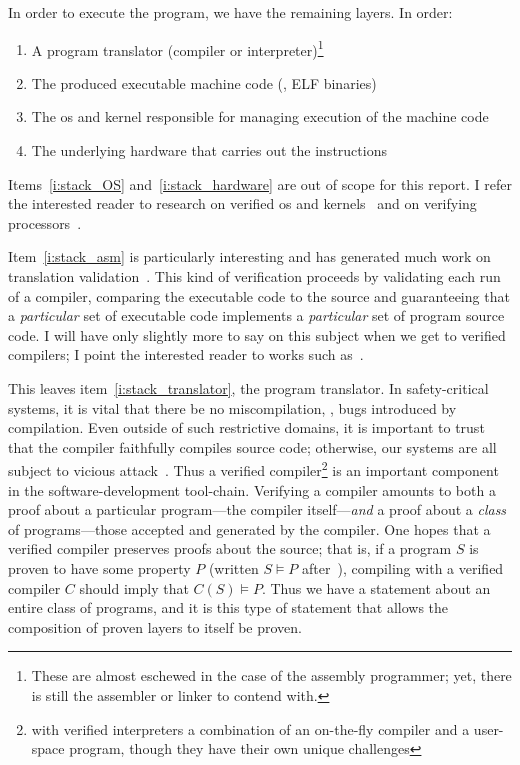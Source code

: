 In order to execute the program, we have the remaining layers. In order:
\begin{enumerate}
    \item\label{i:stack_translator} A program translator (compiler or
        interpreter)\footnote{These are almost eschewed in the case of the
        assembly programmer; yet, there is still the assembler or linker to
        contend with.}
    \item\label{i:stack_asm} The produced executable machine code (\eg, ELF
        binaries)
    \item\label{i:stack_OS} The \gls{os} and kernel responsible for managing execution
        of the machine code
    \item\label{i:stack_hardware} The underlying hardware that carries out the
        instructions
\end{enumerate}

Items~\ref{i:stack_OS} and~\ref{i:stack_hardware} are out of scope for this
report. I refer the interested reader to research on verified \gls{os} and
kernels~\cite{Klein_EHACDEEKNSTW_09,Klein_AEHCDEEKNSTW_10,Klein_AEMSKH_14,Sewell_KH_16,Narayanan_2019,Narayan_2020,Nelson_2017}
and on verifying
processors~\cite{sturton-memocode13,Sturton_2013,Bradfield_2016,zhang2017identifying,zhang2018recursive,zhang2018end}.

Item~\ref{i:stack_asm} is particularly interesting and has generated much work
on translation validation~\cite{Pnueli_1998}. This kind of verification proceeds
by validating each run of a compiler, comparing the executable code to the
source and guaranteeing that a \emph{particular} set of executable code
implements a \emph{particular} set of program source code. I will have only
slightly more to say on this subject when we get to verified compilers; I point
the interested reader to works such
as~\cite{Sewell:phd,Sewell_KH_16,Sewell_2013,Necula_2000}.

This leaves item~\ref{i:stack_translator}, the program translator. In
safety-critical systems, it is vital that there be no miscompilation, \ie, bugs
introduced by compilation. Even outside of such restrictive domains, it is
important to trust that the compiler faithfully compiles source code; otherwise,
our systems are all subject to vicious attack~\cite{Thompson_1984}. Thus a
verified compiler\footnote{with verified interpreters a combination of an
on-the-fly compiler and a user-space program, though they have their own unique
challenges} is an important component in the software-development tool-chain.
Verifying a compiler amounts to both a proof about a particular program---the
compiler itself---\emph{and} a proof about a \emph{class} of programs---those
accepted and generated by the compiler. One hopes that a verified compiler
preserves proofs about the source; that is, if a program \(S\) is proven to have
some property \(P\) (written \(S \models P\) after~\cite{Leroy-Compcert-CACM}),
compiling with a verified compiler \(C\) should imply that \(C(S) \models P\).
Thus we have a statement about an entire class of programs, and it is this type
of statement that allows the composition of proven layers to itself be proven.

